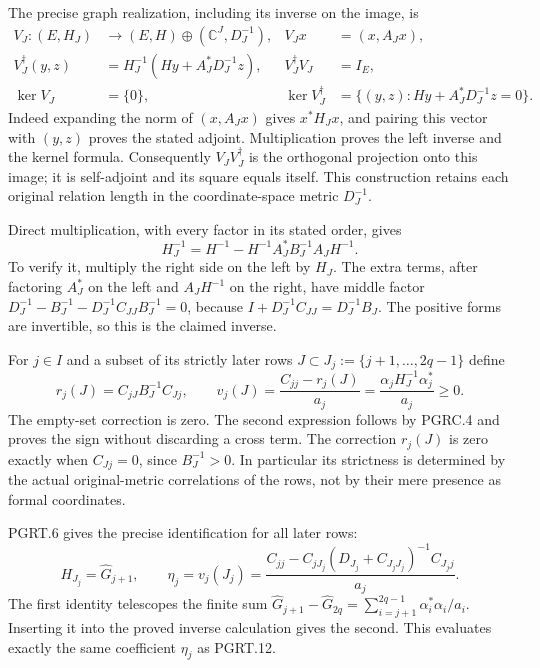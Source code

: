 The precise graph realization, including its inverse on the image,
is
\[
 \begin{aligned}
 V_J:(E,H_J)&\longrightarrow(E,H)\oplus(\mathbb{C}^J,D_J^{-1}),
 &V_Jx&=(x,A_Jx),\\
 V_J^\dagger(y,z)&=H_J^{-1}(Hy+A_J^*D_J^{-1}z),
 &V_J^\dagger V_J&=I_E,\\
 \ker V_J&=\{0\},
 &\ker V_J^\dagger&=\{(y,z):Hy+A_J^*D_J^{-1}z=0\}.
 \end{aligned}
 \tag{PGRC.3}\label{GraphV2:eq:pgrc-source-map}
\]
Indeed expanding the norm of $(x,A_Jx)$ gives $x^*H_Jx$,
and pairing this vector with $(y,z)$ proves the stated adjoint.
Multiplication proves the left inverse and the kernel formula.
Consequently $V_JV_J^\dagger$ is the orthogonal projection onto
this image; it is self-adjoint and its square equals itself.
This construction retains each original relation length in the
coordinate-space metric $D_J^{-1}$.

Direct multiplication, with every factor in its stated order, gives
\[
 H_J^{-1}=H^{-1}-H^{-1}A_J^*B_J^{-1}A_JH^{-1}.
 \tag{PGRC.4}\label{GraphV2:eq:pgrc-subset-inverse}
\]
To verify it, multiply the right side on the left by $H_J$.
The extra terms, after factoring $A_J^*$ on the left and
$A_JH^{-1}$ on the right, have middle factor
$D_J^{-1}-B_J^{-1}-D_J^{-1}C_{JJ}B_J^{-1}=0$,
because $I+D_J^{-1}C_{JJ}=D_J^{-1}B_J$.
The positive forms are invertible, so this is the claimed inverse.

For $j\in I$ and a subset of its strictly later rows
$J\subset J_j:=\{j+1,\ldots,2q-1\}$ define
\[
 r_j(J)=C_{jJ}B_J^{-1}C_{Jj},\qquad
 v_j(J)=\frac{C_{jj}-r_j(J)}{a_j}
       =\frac{\alpha_jH_J^{-1}\alpha_j^*}{a_j}\geq0.
 \tag{PGRC.5}\label{GraphV2:eq:pgrc-correlation-removal}
\]
The empty-set correction is zero. The second expression follows
by PGRC.4 and proves the sign without discarding a cross term.
The correction $r_j(J)$ is zero exactly when $C_{Jj}=0$, since
$B_J^{-1}>0$. In particular its strictness is determined by the
actual original-metric correlations of the rows, not by their
mere presence as formal coordinates.

PGRT.6 gives the precise identification for all later rows:
\[
 H_{J_j}=\widehat G_{j+1},\qquad
 \eta_j=v_j(J_j)
  =\frac{C_{jj}-C_{jJ_j}(D_{J_j}+C_{J_jJ_j})^{-1}C_{J_jj}}{a_j}.
 \tag{PGRC.6}\label{GraphV2:eq:pgrc-exact-row}
\]
The first identity telescopes the finite sum
$\widehat G_{j+1}-\widehat G_{2q}
=\sum_{i=j+1}^{2q-1}\alpha_i^*\alpha_i/a_i$.
Inserting it into the proved inverse calculation gives the second.
This evaluates exactly the same coefficient $\eta_j$ as PGRT.12.

